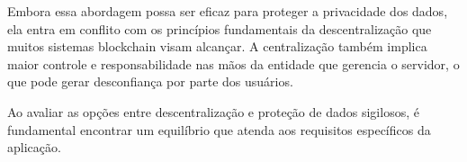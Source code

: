 Embora essa abordagem possa ser eficaz para proteger a privacidade dos dados, ela entra em conflito com os princípios fundamentais da descentralização que muitos sistemas blockchain visam alcançar. A centralização também implica maior controle e responsabilidade nas mãos da entidade que gerencia o servidor, o que pode gerar desconfiança por parte dos usuários.

Ao avaliar as opções entre descentralização e proteção de dados sigilosos, é fundamental encontrar um equilíbrio que atenda aos requisitos específicos da aplicação. 

 
